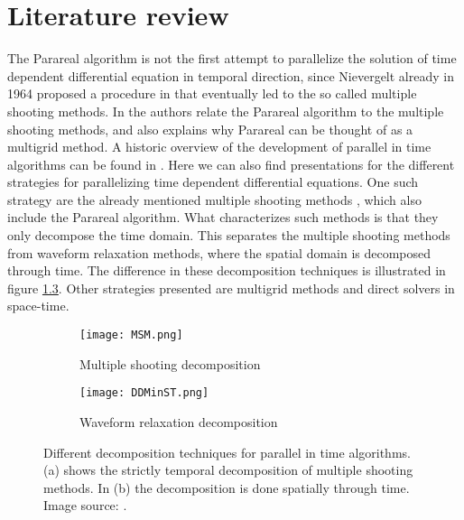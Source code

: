 \chapter{Literature review} \label{lit_chap}
The Parareal algorithm is not the first attempt to parallelize the solution of time dependent differential equation in temporal direction, since Nievergelt already in 1964 proposed a procedure in \cite{nievergelt1964parallel} that eventually led to the so called multiple shooting methods. In \cite{gander2007superlinear} the authors relate the Parareal algorithm to the multiple shooting methods, and also explains why Parareal can be thought of as a multigrid method. A historic overview of the development of parallel in time algorithms can be found in \cite{gander201550}. Here we can also find presentations for the different strategies for parallelizing time dependent differential equations. One such strategy are the already mentioned multiple shooting methods \cite{nievergelt1964parallel,bellen1989parallel}, which also include the Parareal algorithm. What characterizes such methods is that they only decompose the time domain. This separates the multiple shooting methods from waveform relaxation methods\cite{lelarasmee1982waveform,gander1996overlapping}, where the spatial domain is decomposed through time. The difference in these decomposition techniques is illustrated in figure \ref{fig:fig}. Other strategies presented are multigrid \cite{hackbusch1985parabolic,lubich1987multi,horton1995space} methods and direct solvers in space-time\cite{miranker1967parallel,maday2008parallelization,guttel2013parallel}.
\\
\begin{figure}[h]
\centering
\begin{subfigure}{.5\textwidth}
  \centering
  \texttt{[image: MSM.png]}
  \caption{Multiple shooting decomposition}
  \label{fig:sfig1}
\end{subfigure}%
\begin{subfigure}{.5\textwidth}
  \centering
  \texttt{[image: DDMinST.png]}
  \caption{Waveform relaxation decomposition}
  \label{fig:sfig2}
\end{subfigure}
\caption{Different decomposition techniques for parallel in time algorithms. (a) shows the strictly temporal decomposition of multiple shooting methods. In (b) the decomposition is done spatially through time. Image source: \cite{gander201550}.}
\label{fig:fig}
\end{figure}
\noindent
\\
